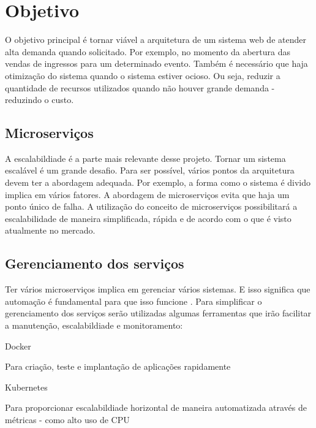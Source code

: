 \chapter{Objetivo}

O objetivo principal é tornar viável a arquitetura de um sistema web de atender
alta demanda quando solicitado. Por exemplo, no momento da abertura das vendas
de ingressos para um determinado evento. Também é necessário que haja otimização
do sistema quando o sistema estiver ocioso. Ou seja, reduzir a quantidade de
recursos utilizados quando não houver grande demanda - reduzindo o custo.

\section{Microserviços}

A escalabildiade é a parte mais relevante desse projeto. Tornar um sistema escalável
é um grande desafio. Para ser possível, vários pontos da arquitetura devem ter a
abordagem adequada. Por exemplo, a forma como o sistema é divido implica em vários
fatores. A abordagem de microserviços evita que haja um ponto único de falha. A
utilização do conceito de microserviços possibilitará a escalabilidade de maneira
simplificada, rápida e de acordo com o que é visto atualmente no mercado.

\section{Gerenciamento dos serviços}

Ter vários microserviços implica em gerenciar
vários sistemas. E isso significa que automação é fundamental para que isso funcione
\cite{martin-fowler-microservices}.
Para simplificar o gerenciamento dos serviços serão utilizadas algumas ferramentas que
irão facilitar a manutenção, escalabildiade e monitoramento:

\begin{alineas}

  \item Docker

  \begin{alineas}
     \item Para criação, teste e implantação de aplicações rapidamente \cite{aws-o-que-e-o-docker}
  \end{alineas}

  \item Kubernetes

  \begin{alineas}
     \item Para proporcionar escalabildiade horizontal de maneira automatizada através de métricas
           - como alto uso de CPU \cite{kubernetes-horizontal-pod-autoscaling}
  \end{alineas}

\end{alineas}

